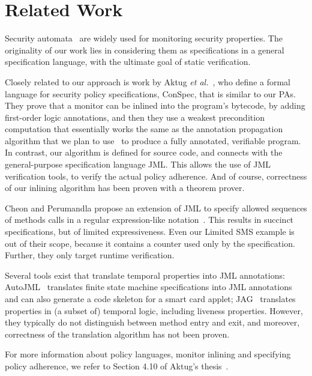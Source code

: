 \section{Related Work}\label{SecRelated}

Security automata~\cite{Schneider99} are widely used for monitoring
security properties. The originality of our work lies in considering
them as specifications in a general specification language, with the
ultimate goal of static verification.

Closely related to our approach is work by Aktug \emph{et
al.}~\cite{Aktug07,Aktug08,AktugDG08}, who define a formal language
for security policy specifications, ConSpec, that is similar to our
PAs.  They prove that a monitor can be inlined into the program's
bytecode, by adding first-order logic annotations, and then they use a
weakest precondition computation that essentially works the same as
the annotation propagation algorithm that we plan to
use~\cite{PavlovaBBHL04} to produce a fully annotated, verifiable
program. In contrast, our algorithm is defined for source code, and
connects with the general-purpose specification language JML. This
allows the use of JML verification tools, to verify the actual policy
adherence. And of course, correctness of our inlining algorithm has
been proven with a theorem prover.

Cheon and Perumandla propose an extension of JML to specify allowed
sequences of methods calls in a regular expression-like
notation~\cite{Cheon07}.  This results in succinct specifications, but
of limited expressiveness. Even our Limited SMS example is out of
their scope, because it contains a counter used only by the
specification. Further, they only target runtime verification.

Several tools exist that translate temporal properties into JML
annotations: AutoJML~\cite{Hubbers03} translates finite state machine
specifications into JML annotations and can also generate a code
skeleton for a smart card applet; JAG~\cite{Giorgetti06} translates
properties in (a subset of) temporal logic, including liveness
properties.  However, they typically do not distinguish between method
entry and exit, and moreover, correctness of the translation algorithm
has not been proven.

For more information about policy languages, monitor inlining and
specifying policy adherence, we refer to Section 4.10 of Aktug's
thesis~\cite{Aktug08}.
